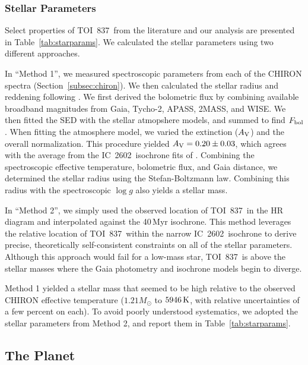 \documentclass[12pt,twocolumn,tighten]{aastex63}
\newcommand{\tn}{TOI~837} %
\newcommand{\cn}{IC~2602} %
\begin{document}
\subsubsection{Stellar Parameters}
\label{subsec:starparams}

Select properties of \tn\ from the literature and our analysis are
presented in Table~\ref{tab:starparams}.  We calculated the stellar
parameters using two different approaches.

In ``Method 1'', we measured spectroscopic parameters from each of the
CHIRON spectra (Section~\ref{subsec:chiron}).  We then calculated the
stellar radius and reddening following \citet{stassun_accurate_2017}.
We first derived the bolometric flux by combining available broadband
magnitudes from Gaia, Tycho-2, APASS, 2MASS, and WISE.  We then fitted
the SED with the \citet{kurucz_atlas12_2013} stellar atmopshere
models, and summed to find $F_{\rm bol}$.  When fitting the atmosphere
model, we varied the extinction ($A_{\rm V}$) and the overall
normalization.  This procedure yielded $A_{\rm V} = 0.20\pm0.03$,
which agrees with the average from the \cn\ isochrone fits of
\citet{randich_gaiaeso_2018}.  Combining the spectroscopic effective
temperature, bolometric flux, and Gaia distance, we determined the
stellar radius using the Stefan-Boltzmann law.  Combining this radius
with the spectroscopic $\log g$ also yields a stellar mass.

In ``Method 2'', we simply used the observed location of \tn\ in the
HR diagram and interpolated against the 40$\,$Myr isochrone.  This
method leverages the relative location of \tn\ within the narrow \cn\
isochrone to derive precise, theoretically self-consistent constraints
on all of the stellar parameters.  Although this approach would fail
for a low-mass star, \tn\ is above the stellar masses where the Gaia
photometry and isochrone models begin to diverge.

Method 1 yielded a stellar mass that seemed to be high relative to the
observed CHIRON effective temperature ($1.21 M_\odot$ to $5946\,{\rm
K}$, with relative uncertainties of a few percent on each). To avoid
poorly understood systematics,  we adopted the stellar parameters from
Method 2, and report them in Table~\ref{tab:starparams}.



\subsection{The Planet}
\label{subsec:planet}
\end{document}
